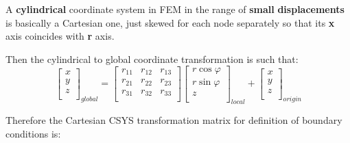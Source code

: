 \newpage
\begin{bbox}
    A \textbf{cylindrical} coordinate system in FEM in the range of \textbf{small}
    \textbf{displacements} is basically a Cartesian one, just skewed for each
    node separately so that its \textbf{x} axis coincides with \textbf{r} axis.

    Then the cylindrical to global coordinate transformation is such that:
    \begin{equation}
        \begin{bmatrix}
            x \\
            y \\
            z \\
        \end{bmatrix}_{global}
        = \begin{bmatrix}
            r_{11} & r_{12} & r_{13} \\
            r_{21} & r_{22} & r_{23} \\
            r_{31} & r_{32} & r_{33} \\
        \end{bmatrix}
        \begin{bmatrix}
            r \cos \varphi \\
            r \sin \varphi \\
            z \\
        \end{bmatrix}_{local}
        + \begin{bmatrix}
            x \\
            y \\
            z \\
        \end{bmatrix}_{origin}
    \end{equation}

    Therefore the Cartesian CSYS transformation matrix for definition of
    boundary conditions is:


\end{bbox}
